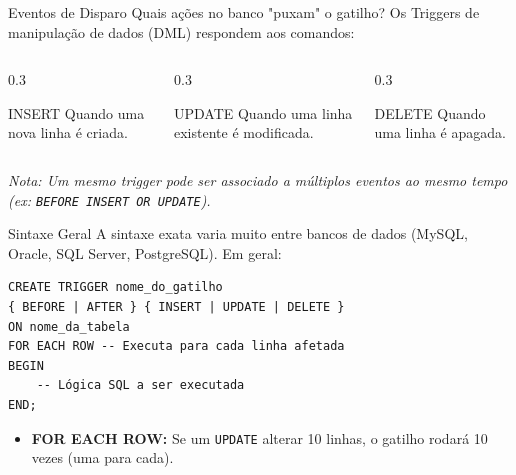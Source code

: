 \documentclass[9pt]{beamer}
\begin{document}
\begin{frame}{Eventos de Disparo}
    Quais ações no banco "puxam" o gatilho? Os Triggers de manipulação de dados (DML) respondem aos comandos:
    
    \vspace{0.3cm}
    \begin{columns}[T]
        \begin{column}{0.3\textwidth}
            \begin{block}{\centering INSERT}
                \centering Quando uma nova linha é criada.
            \end{block}
        \end{column}
        \begin{column}{0.3\textwidth}
            \begin{block}{\centering UPDATE}
                \centering Quando uma linha existente é modificada.
            \end{block}
        \end{column}
        \begin{column}{0.3\textwidth}
            \begin{block}{\centering DELETE}
                \centering Quando uma linha é apagada.
            \end{block}
        \end{column}
    \end{columns}
    
    \vspace{0.4cm}
    \textit{Nota: Um mesmo trigger pode ser associado a múltiplos eventos ao mesmo tempo (ex: \texttt{BEFORE INSERT OR UPDATE}).}
\end{frame}

\begin{frame}[fragile]{Sintaxe Geral}
    A sintaxe exata varia muito entre bancos de dados (MySQL, Oracle, SQL Server, PostgreSQL). Em geral:
    
    \begin{lstlisting}
CREATE TRIGGER nome_do_gatilho
{ BEFORE | AFTER } { INSERT | UPDATE | DELETE }
ON nome_da_tabela
FOR EACH ROW -- Executa para cada linha afetada
BEGIN
    -- Lógica SQL a ser executada
END;
    \end{lstlisting}
    
    \begin{itemize}
        \item \textbf{FOR EACH ROW:} Se um \texttt{UPDATE} alterar 10 linhas, o gatilho rodará 10 vezes (uma para cada).
    \end{itemize}
\end{frame}
\end{document}
